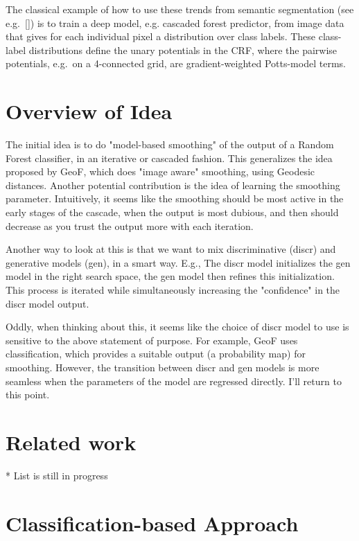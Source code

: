 The classical example of how to use these trends from semantic segmentation (see e.g.\ []) is to train a deep model, e.g. cascaded forest predictor, from image data that gives for each individual pixel a distribution over class labels. These class-label distributions define the unary potentials in the CRF, where the pairwise potentials, e.g.\ on a 4-connected grid, are gradient-weighted Potts-model terms. 
%

\section{Overview of Idea}

The initial idea is to do "model-based smoothing" of the output of a Random Forest classifier, in an iterative or cascaded fashion.  This generalizes the idea proposed by GeoF, which does "image aware" smoothing, using Geodesic distances.  Another potential contribution is the idea of learning the smoothing parameter.  Intuitively, it seems like the smoothing should be most active in the early stages of the cascade, when the output is most dubious, and then should decrease as you trust the output more with each iteration.

Another way to look at this is that we want to mix discriminative (discr) and generative models (gen), in a smart way.  E.g., The discr model initializes the gen model in the right search space, the gen model then refines this initialization.  This process is iterated while simultaneously increasing the "confidence" in the discr model output.

Oddly, when thinking about this, it seems like the choice of discr model to use is sensitive to the above statement of purpose.  For example, GeoF uses classification, which provides a suitable output (a probability map) for smoothing.  However, the transition between discr and gen models is more seamless when the parameters of the model are regressed directly.  I'll return to this point.

\section{Related work}

* List is still in progress


\section{Classification-based Approach}

